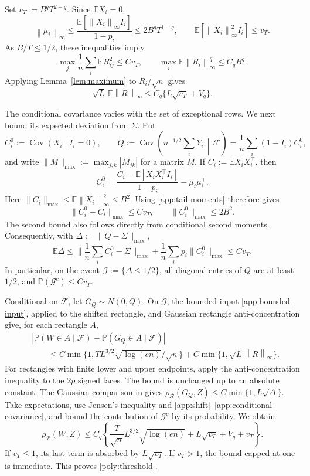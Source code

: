 \documentclass[11pt,letterpaper]{article}
\theoremstyle{remark}
\newcommand{\E}{\mathbb E}
\newcommand{\Pp}{\mathbb P}
\newcommand{\Cov}{\operatorname{Cov}}
\newcommand{\norm}[1]{\left\lVert#1\right\rVert}
\newcommand{\maxnorm}[1]{\lVert#1\rVert_{\max}}
\newcommand{\rh}{\rho_{\mathcal R}}
\begin{document}
Set \(v_T:=B^qT^{2-q}\). Since \(\E X_i=0\),
\begin{equation}
 \norm{\mu_i}_\infty
 \le\frac{\E[\norm{X_i}_\infty I_i]}{1-p_i}
 \le2B^qT^{1-q},\qquad
 \E[\norm{X_i}_\infty^2 I_i]\le v_T.
 \label{app:tail-moments}
\end{equation}
As \(B/T\le1/2\), these inequalities imply
\[
 \max_j\frac1n\sum_i\E R_{ij}^2\le C v_T,\qquad
 \max_i\E\norm{R_i}_\infty^q\le C_qB^q.
\]
Applying Lemma~\ref{lem:maximum} to \(R_i/\sqrt n\) gives
\begin{equation}
 \sqrt L\,\E\norm R_\infty
 \le C_q\{L\sqrt{v_T}+V_q\}.
 \label{app:shift}
\end{equation}

The conditional covariance varies with the set of exceptional rows.
We next bound its expected deviation from \(\Sigma\). Put
\[
 C_i^0:=\Cov(X_i\mid I_i=0),\qquad
 Q:=\Cov\left(n^{-1/2}\sum_iY_i\,\middle|\,\mathcal F\right)
   =\frac1n\sum_i(1-I_i)C_i^0,
\]
and write \(\maxnorm M:=\max_{j,k}|M_{jk}|\) for a matrix \(M\).
If \(C_i:=\E X_iX_i^\top\), then
\[
 C_i^0=\frac{C_i-\E[X_iX_i^\top I_i]}{1-p_i}
          -\mu_i\mu_i^\top.
\]
Here \(\maxnorm{C_i}\le\E\norm{X_i}_\infty^2\le B^2\).
Using \eqref{app:tail-moments} therefore gives
\[
 \maxnorm{C_i^0-C_i}\le C v_T,
 \qquad \maxnorm{C_i^0}\le2B^2.
\]
The second bound also follows directly from conditional second moments.
Consequently, with \(\Delta:=\maxnorm{Q-\Sigma}\),
\begin{equation}
 \E\Delta
 \le\maxnorm{\frac1n\sum_i C_i^0-\Sigma}
       +\frac1n\sum_i p_i\maxnorm{C_i^0}
 \le C v_T.
 \label{app:conditional-covariance}
\end{equation}
In particular, on the event \(\mathcal G:=\{\Delta\le1/2\}\), all
diagonal entries of \(Q\) are at least \(1/2\), and
\(\Pp(\mathcal G^c)\le C v_T\).

Conditional on \(\mathcal F\), let \(G_Q\sim N(0,Q)\). On
\(\mathcal G\), the bounded input \eqref{app:bounded-input}, applied
to the shifted rectangle, and Gaussian rectangle anti-concentration
give, for each rectangle \(A\),
\begin{align*}
 &|\Pp(W\in A\mid\mathcal F)-\Pp(G_Q\in A\mid\mathcal F)|\\
 &\hspace{2em}\le
 C\min\{1,TL^{3/2}\sqrt{\log(en)}/\sqrt n\}
       +C\min\{1,\sqrt L\norm R_\infty\}.
\end{align*}
For rectangles with finite lower and upper endpoints, apply the
anti-concentration inequality to the \(2p\) signed faces. The bound
is unchanged up to an absolute constant. The Gaussian comparison in
\cite[Proposition~2.1]{CCKK2022} gives
\(\rh(G_Q,Z)\le C\min\{1,L\sqrt\Delta\}\).
Take expectations, use Jensen's inequality and
\eqref{app:shift}--\eqref{app:conditional-covariance}, and bound the
contribution of \(\mathcal G^c\) by its probability. We obtain
\[
 \rh(W,Z)\le C_q\left\{
 \frac{T}{\sqrt n}L^{3/2}\sqrt{\log(en)}
 +L\sqrt{v_T}+V_q+v_T\right\}.
\]
If \(v_T\le1\), its last term is absorbed by \(L\sqrt{v_T}\).
If \(v_T>1\), the bound capped at one is immediate. This proves
\eqref{poly:threshold}.
\end{document}
